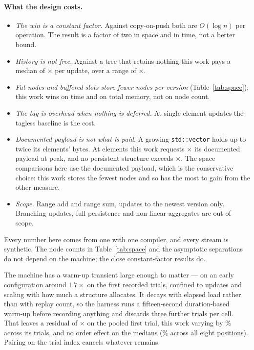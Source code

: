 \documentclass[11pt,a4paper]{article}
\begin{document}
\paragraph{What the design costs.}
\begin{itemize}[leftmargin=1.4em,itemsep=1pt]
\item \emph{The win is a constant factor.} Against copy-on-push both are
  $O(\log n)$ per operation. The result is a factor of two in space and
   in time, not a better bound.
\item \emph{History is not free.} Against a tree that retains nothing this work
  pays a median of $\times$ per update, over a range of
  $\times$.
\item \emph{Fat nodes and buffered slots store fewer nodes per version}
  (Table~\ref{tab:space}); this work wins on time and on total memory, not on node
  count.
\item \emph{The tag is overhead when nothing is deferred.} At single-element
  updates the tagless baseline is  the cost.
\item \emph{Documented payload is not what is paid.} A growing
  \texttt{std::vector} holds up to twice its elements' bytes. At
   elements this work requests $\times$
  its documented payload at peak, and no persistent structure exceeds
  $\times$. The space comparisons here use the documented
  payload, which is the conservative choice: this work stores the fewest nodes and
  so has the most to gain from the other measure.
\item \emph{Scope.} Range add and range sum, updates to the newest version only.
  Branching updates, full persistence and non-linear aggregates are out of scope.
\end{itemize}

\begin{table}[H]
\centering
\caption{Checks on the measurement itself.}
\label{tab:validity}
\small
\fitwidth{}
\end{table}

Every number here comes from one  with one compiler, and every
stream is synthetic. The node counts in Table~\ref{tab:space} and the asymptotic
separations do not depend on the machine; the close constant-factor results do.

The machine has a warm-up transient large enough to matter --- on an early
configuration around $1.7\times$ on the first recorded trials, confined to updates
and scaling with how much a structure allocates. It decays with elapsed load rather
than with replay count, so the harness runs a fifteen-second duration-based warm-up
before recording anything and discards three further trials per cell. That leaves a
residual of $\times$ on the pooled first trial, this work
varying by \% across its trials, and no order effect on the
medians (\% across all eight positions). Pairing on the trial
index cancels whatever remains.
\end{document}
